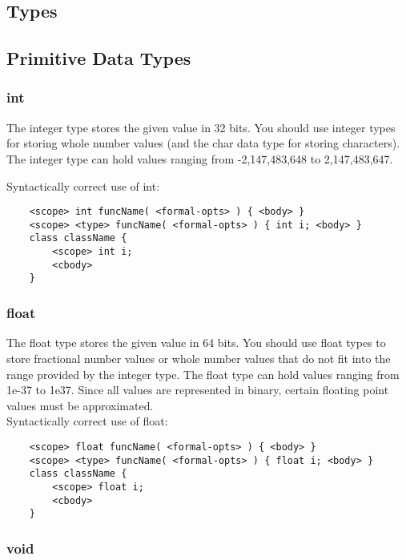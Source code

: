 \begin{homeworkProblem}
	\chapter{Types}
	\section{Primitive Data Types}

	\subsection{int}
	The integer type stores the given value in 32 bits. You should use integer types for storing whole number values (and the char data type for storing characters). The integer type can hold values ranging from -2,147,483,648 to 2,147,483,647.

	Syntactically correct use of int:

	\begin{verbatim}
	<scope> int funcName( <formal-opts> ) { <body> }
	<scope> <type> funcName( <formal-opts> ) { int i; <body> }
	class className {
		<scope> int i;
		<cbody>
	}
	\end{verbatim}


	\subsection{float}

	The float type stores the given value in 64 bits. You should use float types to store fractional number values or whole number values that do not fit into the range provided by the integer type. The float type can hold values ranging from 1e-37 to 1e37. Since all values are represented in binary, certain floating point values must be approximated. \\

	Syntactically correct use of float:

	\begin{verbatim}
	<scope> float funcName( <formal-opts> ) { <body> }
	<scope> <type> funcName( <formal-opts> ) { float i; <body> }
	class className {
		<scope> float i;
		<cbody>
	}
	\end{verbatim}


	\subsection{void}


\end{homeworkProblem}
